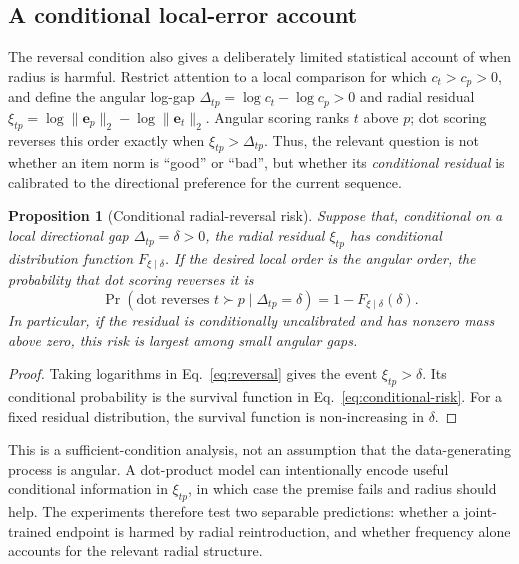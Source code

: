 \documentclass[sigconf,anonymous,review]{acmart}
\newtheorem{proposition}{Proposition}
\begin{document}
\subsection{A conditional local-error account}
The reversal condition also gives a deliberately limited statistical account of when radius is harmful. Restrict attention to a local comparison for which $c_t>c_p>0$, and define the angular log-gap $\Delta_{tp}=\log c_t-\log c_p>0$ and radial residual $\xi_{tp}=\log\|\bm e_p\|_2-\log\|\bm e_t\|_2$. Angular scoring ranks $t$ above $p$; dot scoring reverses this order exactly when $\xi_{tp}>\Delta_{tp}$. Thus, the relevant question is not whether an item norm is ``good'' or ``bad'', but whether its \emph{conditional residual} is calibrated to the directional preference for the current sequence.
\begin{proposition}[Conditional radial-reversal risk]
Suppose that, conditional on a local directional gap $\Delta_{tp}=\delta>0$, the radial residual $\xi_{tp}$ has conditional distribution function $F_{\xi\mid\delta}$. If the desired local order is the angular order, the probability that dot scoring reverses it is
\begin{equation}
\Pr(\text{dot reverses }t\succ p\mid\Delta_{tp}=\delta)=1-F_{\xi\mid\delta}(\delta).\label{eq:conditional-risk}
\end{equation}
In particular, if the residual is conditionally uncalibrated and has nonzero mass above zero, this risk is largest among small angular gaps.
\end{proposition}
\begin{proof}
Taking logarithms in Eq.~\ref{eq:reversal} gives the event $\xi_{tp}>\delta$. Its conditional probability is the survival function in Eq.~\ref{eq:conditional-risk}. For a fixed residual distribution, the survival function is non-increasing in $\delta$.
\end{proof}
This is a sufficient-condition analysis, not an assumption that the data-generating process is angular. A dot-product model can intentionally encode useful conditional information in $\xi_{tp}$, in which case the premise fails and radius should help. The experiments therefore test two separable predictions: whether a joint-trained endpoint is harmed by radial reintroduction, and whether frequency alone accounts for the relevant radial structure.
\end{document}
